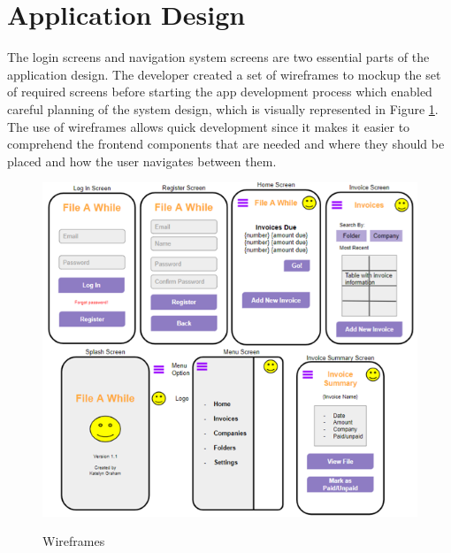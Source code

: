 \section{Application Design}
The login screens and navigation system screens are two essential parts of the application design. The developer created a set of wireframes to mockup the set of required screens before starting the app development process which enabled careful planning of the system design, which is visually represented in Figure \ref{image:wireframe}. The use of wireframes allows quick development since it makes it easier to comprehend the frontend components that are needed and where they should be placed and how the user navigates between them.
\begin{figure}[h!]
    \includegraphics[width=1.0\textwidth]
    {images/AllWireframes.png}
    \centering
    \label{image:wireframe}
    \caption{Wireframes}
\end{figure}

